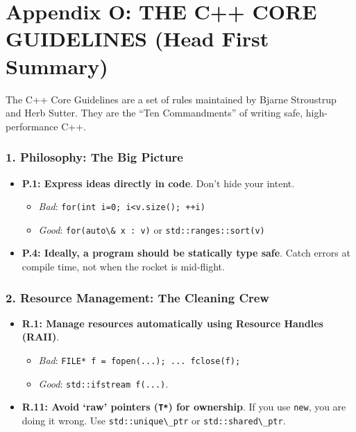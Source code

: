 \hypertarget{appendix-o-the-c-core-guidelines-head-first-summary}{%
\section{Appendix O: THE C++ CORE GUIDELINES (Head First
Summary)}\label{appendix-o-the-c-core-guidelines-head-first-summary}}

The C++ Core Guidelines are a set of rules maintained by Bjarne
Stroustrup and Herb Sutter. They are the ``Ten Commandments'' of writing
safe, high-performance C++.

\hypertarget{philosophy-the-big-picture}{%
\subsubsection{1. Philosophy: The Big
Picture}\label{philosophy-the-big-picture}}

\begin{itemize}
\tightlist
\item
  \textbf{P.1: Express ideas directly in code}. Don't hide your intent.

  \begin{itemize}
  \tightlist
  \item
    \emph{Bad}: \passthrough{\lstinline!for(int i=0; i<v.size(); ++i)!}
  \item
    \emph{Good}: \passthrough{\lstinline!for(auto\& x : v)!} or
    \passthrough{\lstinline!std::ranges::sort(v)!}
  \end{itemize}
\item
  \textbf{P.4: Ideally, a program should be statically type safe}. Catch
  errors at compile time, not when the rocket is mid-flight.
\end{itemize}

\hypertarget{resource-management-the-cleaning-crew}{%
\subsubsection{2. Resource Management: The Cleaning
Crew}\label{resource-management-the-cleaning-crew}}

\begin{itemize}
\tightlist
\item
  \textbf{R.1: Manage resources automatically using Resource Handles
  (RAII)}.

  \begin{itemize}
  \tightlist
  \item
    \emph{Bad}:
    \passthrough{\lstinline!FILE* f = fopen(...); ... fclose(f);!}
  \item
    \emph{Good}: \passthrough{\lstinline!std::ifstream f(...)!}.
  \end{itemize}
\item
  \textbf{R.11: Avoid `raw' pointers (\passthrough{\lstinline!T*!}) for
  ownership}. If you use \passthrough{\lstinline!new!}, you are doing it
  wrong. Use \passthrough{\lstinline!std::unique\_ptr!} or
  \passthrough{\lstinline!std::shared\_ptr!}.
\end{itemize}

